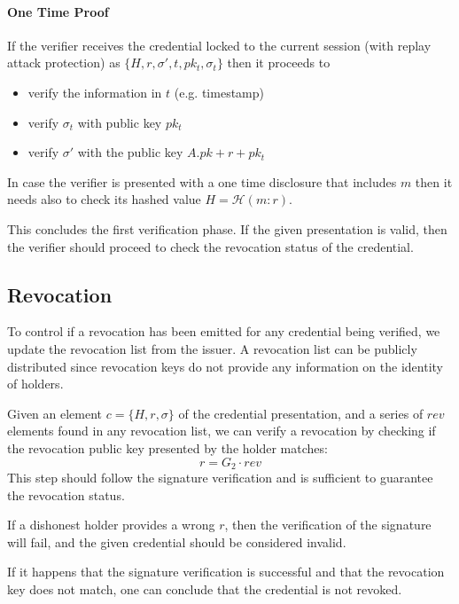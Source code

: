 \paragraph{One Time Proof}

If the verifier receives the credential locked to the current session
(with replay attack protection) as $\{H, r, \sigma', t, pk_t,
\sigma_t\}$ then it proceeds to
\begin{itemize}
\item verify the information in $t$ (e.g. timestamp)
\item verify $\sigma_t$ with public key $pk_t$
\item verify $\sigma'$ with the public key $A.pk + r + pk_t$
	\end{itemize}

In case the verifier is presented with a one time disclosure that
includes $m$ then it needs also to check its hashed value $H =
\mathcal{H}(m : r)$.

This concludes the first verification phase. If the given presentation
is valid, then the verifier should proceed to check the revocation
status of the credential.

\subsection{Revocation}

To control if a revocation has been emitted for any credential being
verified, we update the revocation list from the issuer. A revocation
list can be publicly distributed since revocation keys do not provide
any information on the identity of holders.

Given an element $c = \{H, r, \sigma \}$ of the credential
presentation, and a series of $rev$ elements found in any revocation
list, we can verify a revocation by checking if the revocation public
key presented by the holder matches:
\begin{equation*}
    r = G_2 \cdot rev
\end{equation*}
This step should follow the signature verification and is sufficient
to guarantee the revocation status.

If a dishonest holder provides a wrong $r$, then the verification of
the signature will fail, and the given credential should be considered
invalid.

If it happens that the signature verification is successful and that
the revocation key does not match, one can conclude that the
credential is not revoked.

